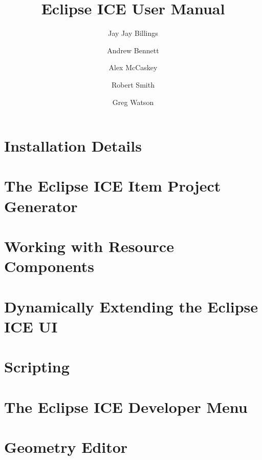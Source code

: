 \documentclass{report}
\begin{document}
\title{Eclipse ICE User Manual}
\author{Jay Jay Billings}
\author{Andrew Bennett}
\author{Alex McCaskey}
\author{Robert Smith}
\author{Greg Watson}
\maketitle{}

\chapter{Installation Details}
\graphicspath{{../../installation/src/}}


\chapter{The Eclipse ICE Item Project Generator}
\graphicspath{{../../newItemGeneration/src/}}


\chapter{Working with Resource Components}
\graphicspath{{../../resourceComponents/src/}}


\chapter{Dynamically Extending the Eclipse ICE UI}
\graphicspath{{../../dynamicUI/src/}}


\chapter{Scripting}
\graphicspath{{../../scripting/src/}}
\lstset{inputpath=../../scripting/src/}


\chapter{The Eclipse ICE Developer Menu}
\graphicspath{{../../developerMenu/src/}}


\chapter{Geometry Editor}
\graphicspath{{../../geometryEditor/src/}}

\end{document}
